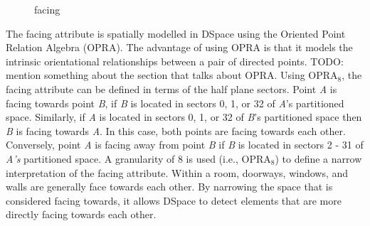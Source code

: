\documentclass[12pt]{ucthesis}
\begin{document}
\begin{figure}[H]
 \centering
 \hspace{10 mm}
  \hspace{10 mm}
 \hspace{10 mm}
 \caption{facing}
\label{display-arrangement}
\end{figure}

The facing attribute is spatially modelled in DSpace using the Oriented Point Relation Algebra \cite{Moratz} (OPRA). The advantage of using OPRA is that it models the intrinsic orientational relationships between a pair of directed points. TODO: mention something about the section that talks about OPRA. Using OPRA$_{8}$, the facing attribute can be defined in terms of the half plane sectors. Point \emph{A} is facing towards point \emph{B}, if \emph{B} is located in sectors 0, 1, or 32 of \emph{A}'s partitioned space. Similarly, if \emph{A} is located in sectors 0, 1, or 32 of \emph{B}'s partitioned space then \emph{B} is facing towards \emph{A}. In this case, both points are facing towards each other. Conversely, point \emph{A} is facing away from point \emph{B} if \emph{B} is located in sectors 2 - 31 of \emph{A's} partitioned space. A granularity of 8 is used (i.e., OPRA$_{8}$) to define a narrow interpretation of the facing attribute. Within a room, doorways, windows, and walls are generally face towards each other. By narrowing the space that is considered facing towards, it allows DSpace to detect elements that are more directly facing towards each other.
\end{document}
